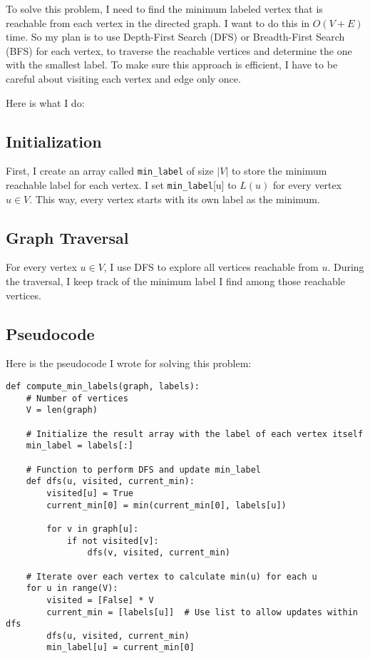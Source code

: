 \documentclass[10pt,letter,notitlepage]{article}
\begin{document}

\begin{Answer}[]

To solve this problem, I need to find the minimum labeled vertex that is reachable from each vertex in the directed graph. I want to do this in \(O(V + E)\) time. So my plan is to use Depth-First Search (DFS) or Breadth-First Search (BFS) for each vertex, to traverse the reachable vertices and determine the one with the smallest label. To make sure this approach is efficient, I have to be careful about visiting each vertex and edge only once.

Here is what I do:

\subsection*{Initialization}
First, I create an array called \texttt{min\_label} of size \(|V|\) to store the minimum reachable label for each vertex. I set \texttt{min\_label}[u] to \(L(u)\) for every vertex \(u \in V\). This way, every vertex starts with its own label as the minimum.

\subsection*{Graph Traversal}
For every vertex \(u \in V\), I use DFS to explore all vertices reachable from \(u\). During the traversal, I keep track of the minimum label I find among those reachable vertices.

\subsection*{Pseudocode}
Here is the pseudocode I wrote for solving this problem:

\begin{verbatim}
def compute_min_labels(graph, labels):
    # Number of vertices
    V = len(graph)
    
    # Initialize the result array with the label of each vertex itself
    min_label = labels[:]

    # Function to perform DFS and update min_label
    def dfs(u, visited, current_min):
        visited[u] = True
        current_min[0] = min(current_min[0], labels[u])
        
        for v in graph[u]:
            if not visited[v]:
                dfs(v, visited, current_min)

    # Iterate over each vertex to calculate min(u) for each u
    for u in range(V):
        visited = [False] * V
        current_min = [labels[u]]  # Use list to allow updates within dfs
        dfs(u, visited, current_min)
        min_label[u] = current_min[0]
    

\end{verbatim}
\end{Answer}
\end{document}

